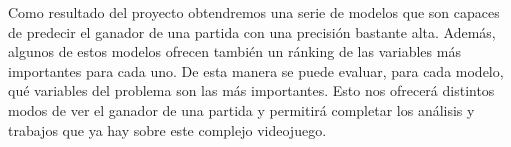 Como resultado del proyecto obtendremos una serie de modelos que son capaces
de predecir el ganador de una partida con una precisión bastante
alta. Además,
algunos de estos modelos ofrecen también un ránking de las variables
más importantes para cada uno. De esta manera se puede evaluar, para cada
modelo, qué variables del problema son las más importantes. Esto nos ofrecerá
distintos modos de ver el ganador de una partida y permitirá completar los
análisis y trabajos que ya hay sobre este complejo videojuego.

